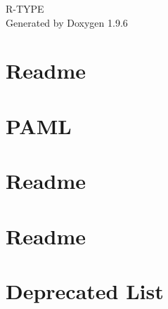 \documentclass[twoside]{book}
\newcommand{\+}{\discretionary{\mbox{\scriptsize$\hookleftarrow$}}{}{}}
\newcommand{\clearemptydoublepage}{%
    \newpage{\pagestyle{empty}\cleardoublepage}%
  }
\begin{document}
  \raggedbottom
    \hypersetup{pageanchor=false,
                bookmarksnumbered=true,
                pdfencoding=unicode
               }
  \begin{titlepage}
  \vspace*{7cm}
  \begin{center}%
  {\Large R-\/\+TYPE}\\
  \vspace*{1cm}
  {\large Generated by Doxygen 1.9.6}\\
  \end{center}
  \end{titlepage}
  \clearemptydoublepage
  \tableofcontents
  \clearemptydoublepage
  \hypersetup{pageanchor=true}
\chapter{Readme}
\label{md__home_Teyi_Epitech_Semestre5_CPP_rtype_src_PAML_Graphics_Readme}

\chapter{PAML}
\label{md__home_Teyi_Epitech_Semestre5_CPP_rtype_src_PAML_Readme}

\chapter{Readme}
\label{md__home_Teyi_Epitech_Semestre5_CPP_rtype_src_PAML_System_Readme}

\chapter{Readme}
\label{md__home_Teyi_Epitech_Semestre5_CPP_rtype_src_PAML_Window_Readme}

\chapter{Deprecated List}
\label{deprecated}

\end{document}
